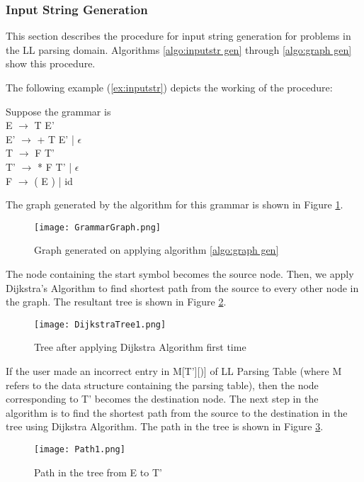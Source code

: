 \subsubsection{Input String Generation}
\label{ssec:inputgen}

This section describes the procedure for input string generation for problems in the LL parsing domain. Algorithms \ref{algo:inputstr gen} through \ref{algo:graph gen} show this procedure.

The following example (\ref{ex:inputstr}) depicts the working of the procedure:
\begin{example}
\label{ex:inputstr}
Suppose the grammar is \\
E $\to$ T E' \\
E' $\to$ + T E' | $\epsilon$ \\
T $\to$ F T' \\
T' $\to$ * F T' | $\epsilon$ \\
F $\to$ ( E ) | id

The graph generated by the algorithm for this grammar is shown in Figure \ref{fig:Grammar Graph}.
\begin{figure}
\centering
\texttt{[image: GrammarGraph.png]}
\caption{Graph generated on applying algorithm \ref{algo:graph gen}}
\label{fig:Grammar Graph}
\end{figure}

The node containing the start symbol becomes the source node. Then, we apply Dijkstra's Algorithm to find shortest path from the source to every other node in the graph. The resultant tree is shown in Figure \ref{fig:Dijkstra Tree 1}.
\begin{figure}
\centering
\texttt{[image: DijkstraTree1.png]}
\caption{Tree after applying Dijkstra Algorithm first time}
\label{fig:Dijkstra Tree 1}
\end{figure}

If the user made an incorrect entry in M[T'][)] of LL Parsing Table (where M refers to the data structure containing the parsing table), then the node corresponding to T' becomes the destination node. The next step in the algorithm is to find the shortest path from the source to the destination in the tree using Dijkstra Algorithm. The path in the tree is shown in Figure \ref{fig:Path 1}.

\begin{figure}
\centering
\texttt{[image: Path1.png]}
\caption{Path in the tree from E to T'}
\label{fig:Path 1}
\end{figure}


\end{example}
